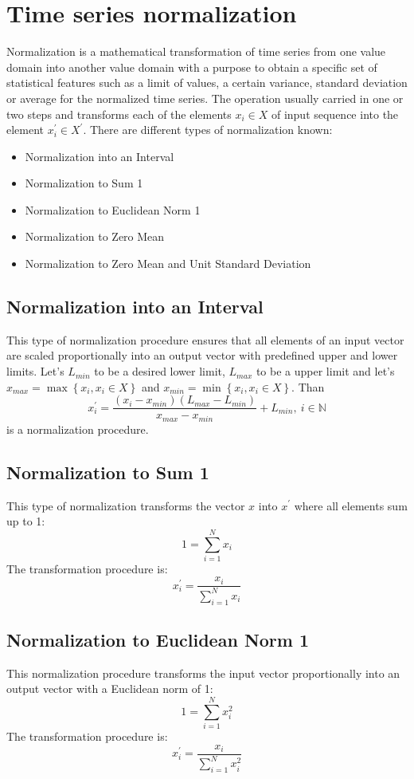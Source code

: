 \section{Time series normalization}

Normalization is a mathematical transformation of time series from one value domain into another value domain with a purpose to obtain a specific set of statistical features such as a limit of values, a certain variance, standard deviation or average for the normalized time series. The operation usually carried in one or two steps and transforms each of the elements $x_{i} \in X$ of input sequence into the element $x_{i}^{'} \in X^{'}$. There are different types of normalization known:
\begin{itemize}
	\item Normalization into an Interval \cite{citeulike:4295248} \cite{citeulike:2753031}
  \item Normalization to Sum 1
  \item Normalization to Euclidean Norm 1
  \item Normalization to Zero Mean
  \item Normalization to Zero Mean and Unit Standard Deviation \cite{citeulike:3815880}
\end{itemize}

\subsection{Normalization into an Interval}
This type of normalization procedure ensures that all elements of an input vector are scaled proportionally into an output vector with predefined upper and lower limits.
Let's $L_{min}$ to be a desired lower limit, $L_{max}$ to be a upper limit and let's $x_{max} = \max \left\{ x_{i}, x_{i} \in X \right\}$ and $x_{min} = \min \left\{ x_{i}, x_{i} \in X \right\}$. Than
\[
x_{i}^{'} = \frac{ (x_{i}-x_{min}) (L_{max} - L_{min}) }{ x_{max} - x_{min} } + L_{min	}, \: i \in \mathbb{N}
\]
is a normalization procedure.

\subsection{Normalization to Sum 1}
This type of normalization transforms the vector $x$ into $x^{'}$ where all elements sum up to 1:
\[
1 = \sum_{i=1}^{N} x_{i}
\]
The transformation procedure is:
\[
x_{i}^{'} = \frac{ x_{i} }{ \sum_{i=1}^{N} x_{i} }
\]

\subsection{Normalization to Euclidean Norm 1}
This normalization procedure transforms the input vector proportionally into an output vector with a Euclidean norm of 1:
\[
1 = \sum_{i=1}^{N} x_{i}^{2}
\]
The transformation procedure is:
\[
x_{i}^{'} = \frac{ x_{i} }{ \sum_{i=1}^{N} x_{i}^2 }
\]

